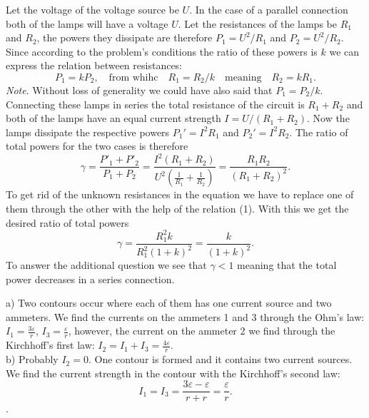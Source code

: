 \documentclass[11pt]{article}
\begin{document}

\solueng
Let the voltage of the voltage source be $U$. In the case of a parallel connection both of the lamps will have a voltage $U$. Let the resistances of the lamps be $R_1$ and $R_2$, the powers they dissipate are therefore $P_1=U^2/R_1$ and $P_2=U^2/R_2$. Since according to the problem’s conditions the ratio of these powers is $k$ we can express the relation between resistances:
\begin{equation}
\label{eq:R12suhe}
P_1 = kP_2, \quad \text{from whihc} \quad R_1 = R_2/k \quad \text{meaning} \quad R_2=kR_1.
\end{equation}
\emph{Note}. Without loss of generality we could have also said that $P_1 = P_2/k$.\\
Connecting these lamps in series the total resistance of the circuit is $R_1+R_2$ and both of the lamps have an equal current strength $I=U/(R_1+R_2)$. Now the lamps dissipate the respective powers $P_1'=I^2R_1$ and $P_2'=I^2R_2$.
The ratio of total powers for the two cases is therefore
\[
\gamma = \frac{P'_1+P'_2}{P_1+P_2} = \frac{I^2(R_1+R_2)}{U^2(\frac{1}{R_1}+\frac{1}{R_2})}=
\frac{R_1R_2}{(R_1+R_2)^2}.
\] 
To get rid of the unknown resistances in the equation we have to replace one of them through the other with the help of the relation (1). With this we get the desired ratio of total powers
\[
\gamma = \frac{R_1^2 k}{R_1^2(1+k)^2} = \frac{k}{(1+k)^2}.
\] 
To answer the additional question we see that $\gamma < 1$ meaning that the total power decreases in a series connection.
\probend
\bigskip


\solueng
a) Two contours occur where each of them has one current source and two ammeters. We find the currents on the ammeters 1 and 3 through the Ohm’s law: $I_1=\frac{3\varepsilon}{r}$, $I_3=\frac{\varepsilon}{r}$, however, the current on the ammeter 2 we find through the Kirchhoff’s first law: $I_2=I_1+I_3=\frac{4\varepsilon}{r}$.\\
b) Probably $I_2=0$. One contour is formed and it contains two current sources. We find the current strength in the contour with the Kirchhoff’s second law:
\[
I_1=I_3=\frac{3\varepsilon-\varepsilon}{r+r}=\frac{\varepsilon}{r}.
\].
\probend
\bigskip
\end{document}
